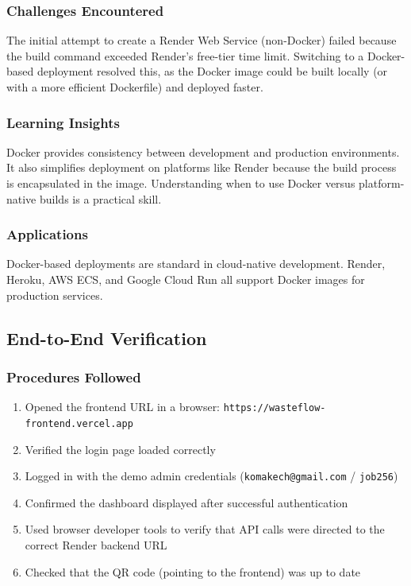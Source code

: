 \documentclass[12pt,a4paper]{article}
\begin{document}
\subsubsection*{Challenges Encountered}
The initial attempt to create a Render Web Service (non-Docker) failed because the build command exceeded Render's free-tier time limit. Switching to a Docker-based deployment resolved this, as the Docker image could be built locally (or with a more efficient Dockerfile) and deployed faster.

\subsubsection*{Learning Insights}
Docker provides consistency between development and production environments. It also simplifies deployment on platforms like Render because the build process is encapsulated in the image. Understanding when to use Docker versus platform-native builds is a practical skill.

\subsubsection*{Applications}
Docker-based deployments are standard in cloud-native development. Render, Heroku, AWS ECS, and Google Cloud Run all support Docker images for production services.

\subsection{End-to-End Verification}
\label{subsec:verification}

\subsubsection*{Procedures Followed}
\begin{enumerate}
    \item Opened the frontend URL in a browser: \texttt{https://wasteflow-frontend.vercel.app}
    \item Verified the login page loaded correctly
    \item Logged in with the demo admin credentials (\texttt{komakech@gmail.com} / \texttt{job256})
    \item Confirmed the dashboard displayed after successful authentication
    \item Used browser developer tools to verify that API calls were directed to the correct Render backend URL
    \item Checked that the QR code (pointing to the frontend) was up to date
\end{enumerate}
\end{document}
